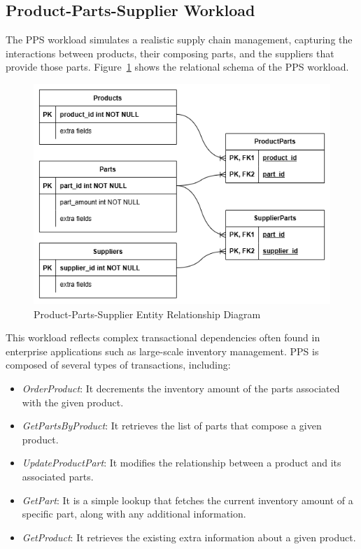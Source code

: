 \subsection{Product-Parts-Supplier Workload}
The PPS workload simulates a realistic supply chain management, capturing the interactions between products, their composing parts, and the suppliers that provide those parts. Figure~\ref{fig: pps-erd} shows the relational schema of the PPS workload. 

\begin{figure}
    \centering
    \includegraphics[width=1\linewidth]{figures/PPS ERD.png}
    \caption{Product-Parts-Supplier Entity Relationship Diagram}
    \label{fig: pps-erd}
\end{figure}

This workload reflects complex transactional dependencies often found in enterprise applications such as large-scale inventory management. PPS is composed of several types of transactions, including:
\begin{itemize}
    \item \textit{OrderProduct}: It decrements the inventory amount of the parts associated with the given product. 
    \item \textit{GetPartsByProduct}: It retrieves the list of parts that compose a given product.
    \item \textit{UpdateProductPart}: It modifies the relationship between a product and its associated parts.
    \item \textit{GetPart}: It is a simple lookup that fetches the current inventory amount of a specific part, along with any additional information.
    \item \textit{GetProduct}: It retrieves the existing extra information about a given product.
\end{itemize}

